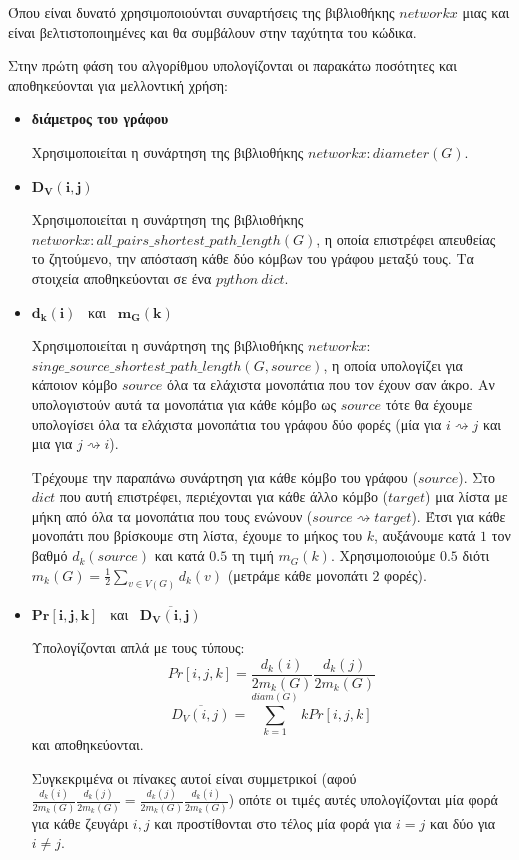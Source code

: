 \documentclass[12pt, letterpaper]{article}
\begin{document}
Όπου είναι δυνατό χρησιμοποιούνται συναρτήσεις της βιβλιοθήκης $networkx$ μιας και 
είναι βελτιστοποιημένες και θα συμβάλουν στην ταχύτητα του κώδικα.

Στην πρώτη φάση του αλγορίθμου υπολογίζονται οι παρακάτω ποσότητες και αποθηκεύονται
για μελλοντική χρήση:
\begin{itemize}
    \item \textbf{διάμετρος του γράφου } 
    
    Χρησιμοποιείται η συνάρτηση της βιβλιοθήκης $networkx: diameter(G)$.
    
    \item  $\mathbf{D_V(i,j)}$
    
    Χρησιμοποιείται η συνάρτηση της βιβλιοθήκης $networkx: all\_pairs\_shortest\_path\_length(G)$,
    η οποία επιστρέφει απευθείας το ζητούμενο, την απόσταση κάθε δύο κόμβων του γράφου
    μεταξύ τους. Τα στοιχεία αποθηκεύονται σε ένα $python \ dict$.


    \item  $\mathbf{d_k(i)}$ \ και \ $\mathbf{m_G(k)}$
    
    Χρησιμοποιείται η συνάρτηση της βιβλιοθήκης $networkx:$ \\
    $ singe\_source\_shortest\_path\_length(G,source)$, η οποία υπολογίζει για κάποιον
    κόμβο $source$ όλα τα ελάχιστα μονοπάτια που τον έχουν σαν άκρο. Αν υπολογιστούν 
    αυτά τα μονοπάτια για κάθε κόμβο ως $source$ τότε θα έχουμε υπολογίσει
    όλα τα ελάχιστα μονοπάτια του γράφου δύο φορές (μία για $i \rightsquigarrow j$ και 
    μια για $j \rightsquigarrow i$).

    Τρέχουμε την παραπάνω συνάρτηση για κάθε κόμβο του γράφου ($source$). Στο $dict$ που 
    αυτή επιστρέφει, περιέχονται για κάθε άλλο κόμβο  ($target$) μια λίστα με μήκη από όλα
    τα μονοπάτια που τους ενώνουν ($source \rightsquigarrow target$). Έτσι για κάθε 
    μονοπάτι που βρίσκουμε στη λίστα, έχουμε το μήκος του $k$, 
    αυξάνουμε κατά $1$ τον βαθμό $d_k(source)$ και κατά $0.5$ τη τιμή 
    $m_G(k)$. Χρησιμοποιούμε $0.5$ διότι $m_k(G) = \frac{1}{2} \sum_{v \in V (G)} d_k(v)$
    (μετράμε κάθε μονοπάτι $2$ φορές).


    \item $\mathbf{Pr[i,j,k]}$  \ και \   $\mathbf{\overline{D_V(i,j)}}$
    
    Υπολογίζονται απλά με τους τύπους:
    \[ Pr[i,j,k] = \frac{d_k(i)}{2m_k(G)} \frac{d_k(j)}{2m_k(G)} \]
    \[ \overline{D_V(i,j)} = \sum_{k=1}^{diam(G)} k Pr[i,j,k] \]
    και αποθηκεύονται. 
    
    Συγκεκριμένα οι πίνακες αυτοί είναι συμμετρικοί (αφού 
    $\frac{d_k(i)}{2m_k(G)} \frac{d_k(j)}{2m_k(G)} = \frac{d_k(j)}{2m_k(G)} \frac{d_k(i)}{2m_k(G)}$)
    οπότε οι τιμές αυτές υπολογίζονται μία φορά για κάθε ζευγάρι $i,j$ και προστίθονται
    στο τέλος μία φορά για $i=j$ και δύο για $i \neq j$.
    


\end{itemize}
\end{document}
